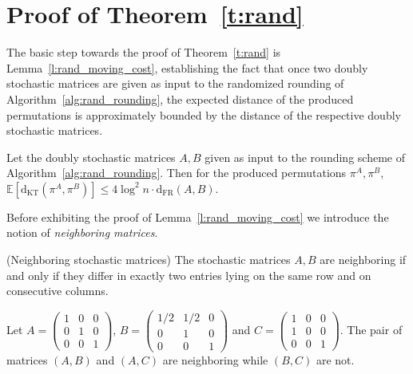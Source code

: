 \documentclass[a4paper,UKenglish,cleveref,autoref, thm-restate]{lipics-v2019}
\def\dkt{\mathrm{d}_{\mathrm{KT}}}
\def\dfr{\mathrm{d}_{\mathrm{FR}}}
\begin{document}
\section{Proof of Theorem~\ref{t:rand}}\label{s:rand}
The basic step towards the proof of Theorem~\ref{t:rand} is Lemma~\ref{l:rand_moving_cost}, establishing the fact that once two doubly stochastic matrices are given as input to the randomized rounding of Algorithm~\ref{alg:rand_rounding}, the expected distance of the produced permutations is approximately bounded by the distance of the respective doubly stochastic matrices.
\begin{lemma}\label{l:rand_moving_cost}
Let the doubly stochastic matrices $A,B$ given as input to the
rounding scheme of
Algorithm~\ref{alg:rand_rounding}. Then for the produced permutations
$\pi^A,\pi^B$, 
$
\mathbb{E}\left[ \dkt(\pi^A,\pi^B) \right] \leq 4\log^2 n \cdot \dfr(A,B)$.
\end{lemma}

\noindent Before exhibiting the proof of Lemma~\ref{l:rand_moving_cost} we introduce the notion of \textit{neighboring matrices}.
\begin{definition}(Neighboring stochastic matrices)
The stochastic matrices $A,B$ are neighboring if and only if they differ in exactly two entries lying on the same row and on consecutive columns.
\end{definition}
\begin{example}
Let $A = 
\begin{pmatrix}
1 & 0 & 0 \\
0 & 1 & 0 \\
0 & 0 & 1
\end{pmatrix}$, $B = 
\begin{pmatrix}
1/2 & 1/2 & 0 \\
0 & 1 & 0 \\
0 & 0 & 1
\end{pmatrix}$ and $C = 
\begin{pmatrix}
1 & 0 & 0 \\
1 & 0 & 0 \\
0 & 0 & 1
\end{pmatrix}$. The pair of matrices
$(A,B)$ and $(A,C)$ are neighboring while $(B,C)$ are not.
\end{example}
\end{document}
